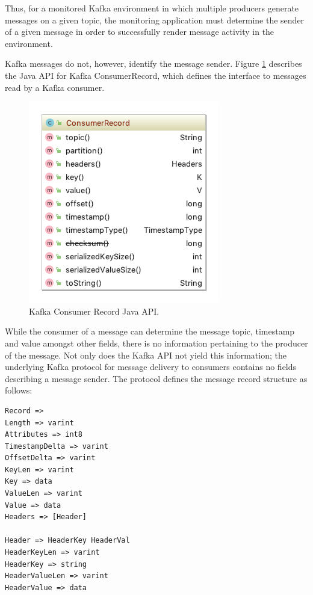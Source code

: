 Thus, for a monitored Kafka environment in which multiple producers generate messages on a given topic, the monitoring application must determine the sender of a given message in order to successfully render message activity in the environment.

Kafka messages do not, however, identify the message sender. Figure \ref{kafka_consumer_record_api} describes the Java API for Kafka ConsumerRecord, which defines the interface to messages read by a Kafka consumer.

\begin{figure}[H]
	\centering  
	\includegraphics[scale=2.5]{figures/design/consumer_record_api.png}
	\caption{Kafka Consumer Record Java API.}
	\label{kafka_consumer_record_api}
\end{figure}

While the consumer of a message can determine the message topic, timestamp and value amongst other fields, there is no information pertaining to the producer of the message. Not only does the Kafka API not yield this information; the underlying Kafka protocol for message delivery to consumers contains no fields describing a message sender.  The protocol defines the message record structure as follows\cite{KafkaProtocol}:

\vspace{5mm}

\begin{lstlisting}[caption={Kafka Protol Message Record Definition},captionpos=b]
Record =>
Length => varint
Attributes => int8
TimestampDelta => varint
OffsetDelta => varint
KeyLen => varint
Key => data
ValueLen => varint
Value => data
Headers => [Header]

Header => HeaderKey HeaderVal
HeaderKeyLen => varint
HeaderKey => string
HeaderValueLen => varint
HeaderValue => data
\end{lstlisting}


